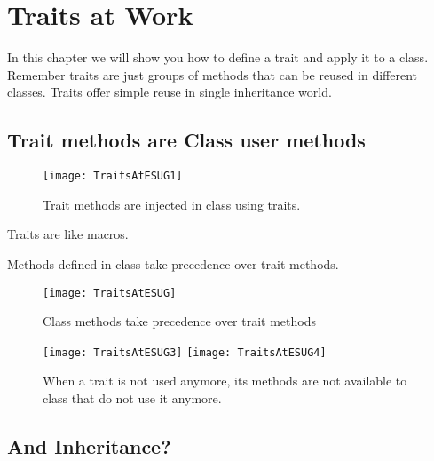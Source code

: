 \documentclass[a4paper,10pt,twoside]{book}
\begin{document}
\fi
\sloppy


\chapter{Traits at Work}

In this chapter we will show you how to define a trait and apply it to a class. Remember traits are just groups of methods that can be reused in different classes. Traits offer simple reuse in single inheritance world. 

\section{Trait methods are Class user methods}


\begin{figure}[h]
\begin{center}
\texttt{[image: TraitsAtESUG1]}
\caption{Trait methods are injected in class using traits.}
\end{center}
\end{figure}

Traits are like macros. 

Methods defined in class take precedence over trait methods.



\begin{figure}[h]
\begin{center}
\texttt{[image: TraitsAtESUG]}
\caption{Class methods take precedence over trait methods}
\end{center}
\end{figure}

\begin{figure}[h]
\begin{center}
\texttt{[image: TraitsAtESUG3]}\hfill
\texttt{[image: TraitsAtESUG4]}
\caption{When a trait is not used anymore, its methods are not available to class that do not use it anymore.}
\end{center}
\end{figure}

\newpage
\section{And Inheritance?}
\end{document}
